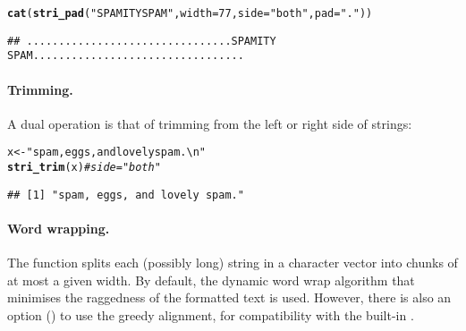 \documentclass[nojss]{jss}\usepackage[]{graphicx}\usepackage[]{xcolor}
\makeatletter
\newcommand{\hlnum}[1]{\textcolor[rgb]{0.686,0.059,0.569}{#1}}%
\newcommand{\hlstr}[1]{\textcolor[rgb]{0.192,0.494,0.8}{#1}}%
\newcommand{\hlcom}[1]{\textcolor[rgb]{0.678,0.584,0.686}{\textit{#1}}}%
\newcommand{\hlstd}[1]{\textcolor[rgb]{0.345,0.345,0.345}{#1}}%
\newcommand{\hlkwb}[1]{\textcolor[rgb]{0.69,0.353,0.396}{#1}}%
\newcommand{\hlkwc}[1]{\textcolor[rgb]{0.333,0.667,0.333}{#1}}%
\newcommand{\hlkwd}[1]{\textcolor[rgb]{0.737,0.353,0.396}{\textbf{#1}}}%
\newenvironment{kframe}{%
 \def\at@end@of@kframe{}%
 \ifinner\ifhmode%
  \def\at@end@of@kframe{\end{minipage}}%
  \begin{minipage}{\columnwidth}%
 \fi\fi%
 \def\FrameCommand##1{\hskip\@totalleftmargin \hskip-\fboxsep
 \colorbox{shadecolor}{##1}\hskip-\fboxsep
     \hskip-\linewidth \hskip-\@totalleftmargin \hskip\columnwidth}%
 \MakeFramed {\advance\hsize-\width
   \@totalleftmargin\z@ \linewidth\hsize
   \@setminipage}}%
 {\par\unskip\endMakeFramed%
 \at@end@of@kframe}
\newenvironment{knitrout}{}{} %
\makeatother
\begin{document}
\begin{knitrout}
\color{fgcolor}\begin{kframe}
\begin{alltt}
\hlkwd{cat}\hlstd{(}\hlkwd{stri_pad}\hlstd{(}\hlstr{"SPAMITY SPAM"}\hlstd{,} \hlkwc{width}\hlstd{=}\hlnum{77}\hlstd{,} \hlkwc{side}\hlstd{=}\hlstr{"both"}\hlstd{,} \hlkwc{pad}\hlstd{=}\hlstr{"."}\hlstd{))}
\end{alltt}
\begin{verbatim}
## ................................SPAMITY SPAM.................................
\end{verbatim}
\end{kframe}
\end{knitrout}







\paragraph{Trimming.}
A dual operation is that of trimming from the left or right side
of strings:

\begin{knitrout}
\color{fgcolor}\begin{kframe}
\begin{alltt}
\hlstd{x} \hlkwb{<-} \hlstr{"      spam, eggs, and lovely spam.\textbackslash{}n"}
\hlkwd{stri_trim}\hlstd{(x)}  \hlcom{# side="both"}
\end{alltt}
\begin{verbatim}
## [1] "spam, eggs, and lovely spam."
\end{verbatim}
\end{kframe}
\end{knitrout}



\paragraph{Word wrapping.}
The  function splits each (possibly long)
string in a character vector into chunks of at most a given width.
By default, the dynamic word wrap algorithm \citep{Knuth:wrap}
that minimises the raggedness of the formatted text is used.
However, there is also an option ()
to use the greedy alignment,
for compatibility with the built-in .
\end{document}

